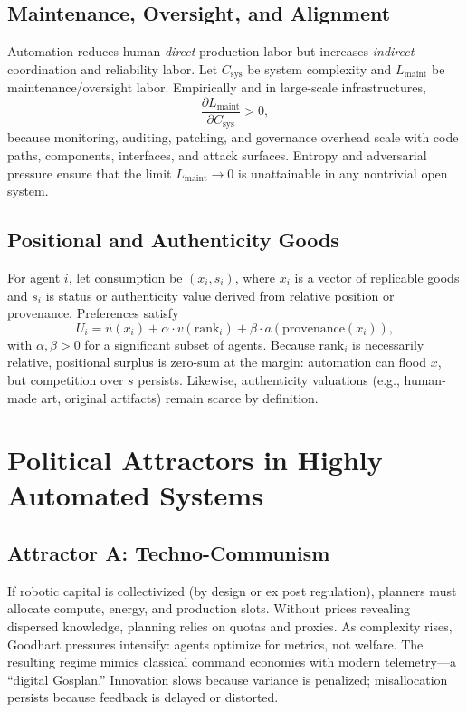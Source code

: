 \documentclass[12pt]{article}
\begin{document}
\subsection{Maintenance, Oversight, and Alignment}
Automation reduces human \emph{direct} production labor but increases \emph{indirect} coordination and reliability labor. Let $C_{\text{sys}}$ be system complexity and $L_{\text{maint}}$ be maintenance/oversight labor. Empirically and in large-scale infrastructures,
\[
\frac{\partial L_{\text{maint}}}{\partial C_{\text{sys}}} > 0,
\]
because monitoring, auditing, patching, and governance overhead scale with code paths, components, interfaces, and attack surfaces. Entropy and adversarial pressure ensure that the limit $L_{\text{maint}} \to 0$ is unattainable in any nontrivial open system.

\subsection{Positional and Authenticity Goods}
For agent $i$, let consumption be $(x_i, s_i)$, where $x_i$ is a vector of replicable goods and $s_i$ is status or authenticity value derived from relative position or provenance. Preferences satisfy
\[
U_i = u(x_i) + \alpha \cdot v(\text{rank}_i) + \beta \cdot a(\text{provenance}(x_i)),
\]
with $\alpha,\beta > 0$ for a significant subset of agents. Because $\text{rank}_i$ is necessarily relative, positional surplus is zero-sum at the margin: automation can flood $x$, but competition over $s$ persists. Likewise, authenticity valuations (e.g., human-made art, original artifacts) remain scarce by definition.

\section{Political Attractors in Highly Automated Systems}
\subsection{Attractor A: Techno-Communism}
If robotic capital is collectivized (by design or ex post regulation), planners must allocate compute, energy, and production slots. Without prices revealing dispersed knowledge, planning relies on quotas and proxies. As complexity rises, Goodhart pressures intensify: agents optimize for metrics, not welfare. The resulting regime mimics classical command economies with modern telemetry---a ``digital Gosplan.'' Innovation slows because variance is penalized; misallocation persists because feedback is delayed or distorted.
\end{document}
